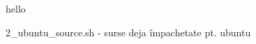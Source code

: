 \documentclass{beamer}
\begin{document}
\begin{frame}{hello}
  \begin{beamerboxesrounded}[lower=block body,shadow=true]{2\_ubuntu\_source.sh - surse deja împachetate pt. ubuntu}
    \small 
  \end{beamerboxesrounded}
\end{frame}
\end{document}
